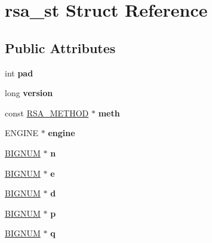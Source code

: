 \hypertarget{structrsa__st}{}\section{rsa\+\_\+st Struct Reference}
\label{structrsa__st}
\subsection*{Public Attributes}
\begin{DoxyCompactItemize}
\item 
\mbox{\label{structrsa__st_a0ad31a89c1623d6a321162b3e6ad0afd}} 
int {\bfseries pad}
\item 
\mbox{\label{structrsa__st_a431bc852602846bf6893a7df86fc2cb3}} 
long {\bfseries version}
\item 
\mbox{\label{structrsa__st_a9bb9437c0d3cae05cbfdca373504137d}} 
const \hyperlink{structrsa__meth__st}{R\+S\+A\+\_\+\+M\+E\+T\+H\+OD} $\ast$ {\bfseries meth}
\item 
\mbox{\label{structrsa__st_a83c24d8df09a7832a195bfe1b4eb00df}} 
E\+N\+G\+I\+NE $\ast$ {\bfseries engine}
\item 
\mbox{\label{structrsa__st_a017d8cb5fef3f0ca9432e7616743a8c9}} 
\hyperlink{structbignum__st}{B\+I\+G\+N\+UM} $\ast$ {\bfseries n}
\item 
\mbox{\label{structrsa__st_a4681b4d0c295ea5a3f86e7b347d9e4f2}} 
\hyperlink{structbignum__st}{B\+I\+G\+N\+UM} $\ast$ {\bfseries e}
\item 
\mbox{\label{structrsa__st_ab0b7b533d5c9c40d03844bac392d05fa}} 
\hyperlink{structbignum__st}{B\+I\+G\+N\+UM} $\ast$ {\bfseries d}
\item 
\mbox{\label{structrsa__st_a1bec6526c3250e11ccce0c549f1b83cd}} 
\hyperlink{structbignum__st}{B\+I\+G\+N\+UM} $\ast$ {\bfseries p}
\item 
\mbox{\label{structrsa__st_a84e322ac5e04068ce455e1962151a260}} 
\hyperlink{structbignum__st}{B\+I\+G\+N\+UM} $\ast$ {\bfseries q}
\item 

\end{DoxyCompactItemize}

